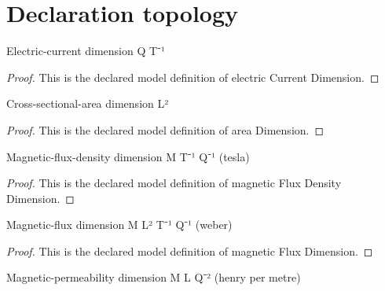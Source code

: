 \section{Declaration topology}
\begin{definition}
  \label{def:physics:phyx-mini-0922:phyxminiproblems-problemphyxmini0922-electriccurrentdimension}
  Electric-current dimension Q T⁻¹
\end{definition}
\begin{proof}
  This is the declared model definition of electric Current Dimension.
\end{proof}
\begin{definition}
  \label{def:physics:phyx-mini-0922:phyxminiproblems-problemphyxmini0922-areadimension}
  Cross-sectional-area dimension L²
\end{definition}
\begin{proof}
  This is the declared model definition of area Dimension.
\end{proof}
\begin{definition}
  \label{def:physics:phyx-mini-0922:phyxminiproblems-problemphyxmini0922-magneticfluxdensitydimension}
  Magnetic-flux-density dimension M T⁻¹ Q⁻¹ (tesla)
\end{definition}
\begin{proof}
  This is the declared model definition of magnetic Flux Density Dimension.
\end{proof}
\begin{definition}
  \label{def:physics:phyx-mini-0922:phyxminiproblems-problemphyxmini0922-magneticfluxdimension}
  Magnetic-flux dimension M L² T⁻¹ Q⁻¹ (weber)
\end{definition}
\begin{proof}
  This is the declared model definition of magnetic Flux Dimension.
\end{proof}
\begin{definition}
  \label{def:physics:phyx-mini-0922:phyxminiproblems-problemphyxmini0922-magneticpermeabilitydimension}
  Magnetic-permeability dimension M L Q⁻² (henry per metre)
\end{definition}
